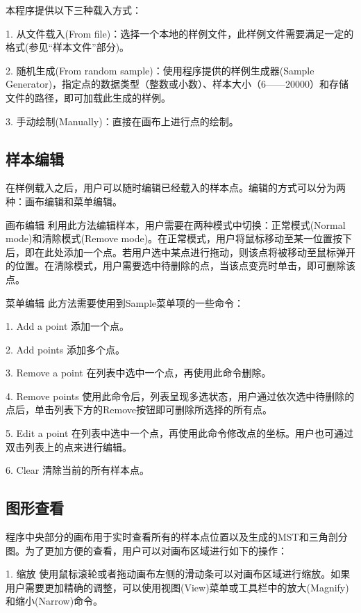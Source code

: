 \documentclass[11pt, a4paper]{article}
\newcommand{\hei}{\CJKfamily{hei}}
\begin{document}
		本程序提供以下三种载入方式：

		1. 从文件载入(From file)：选择一个本地的样例文件，此样例文件需要满足一定的格式(参见“样本文件”部分)。

		2. 随机生成(From random sample)：使用程序提供的样例生成器(Sample Generator)，指定点的数据类型（整数或小数）、样本大小（6——20000）和存储文件的路径，即可加载此生成的样例。

		3. 手动绘制(Manually)：直接在画布上进行点的绘制。

		\subsection{样本编辑}

		在样例载入之后，用户可以随时编辑已经载入的样本点。编辑的方式可以分为两种：画布编辑和菜单编辑。

		{\hei 画布编辑} \quad 利用此方法编辑样本，用户需要在两种模式中切换：正常模式(Normal mode)和清除模式(Remove mode)。在正常模式，用户将鼠标移动至某一位置按下后，即在此处添加一个点。若用户选中某点进行拖动，则该点将被移动至鼠标弹开的位置。在清除模式，用户需要选中待删除的点，当该点变亮时单击，即可删除该点。

		{\hei 菜单编辑} \quad 此方法需要使用到Sample菜单项的一些命令：

		1. Add a point \quad 添加一个点。

		2. Add points  \quad 添加多个点。

		3. Remove a point \quad 在列表中选中一个点，再使用此命令删除。

		4. Remove points  \quad 使用此命令后，列表呈现多选状态，用户通过依次选中待删除的点后，单击列表下方的Remove按钮即可删除所选择的所有点。

		5. Edit a point \quad 在列表中选中一个点，再使用此命令修改点的坐标。用户也可通过双击列表上的点来进行编辑。

		6. Clear  \quad 清除当前的所有样本点。

		\subsection{图形查看}

		程序中央部分的画布用于实时查看所有的样本点位置以及生成的MST和三角剖分图。为了更加方便的查看，用户可以对画布区域进行如下的操作：

		1. 缩放 \quad 使用鼠标滚轮或者拖动画布左侧的滑动条可以对画布区域进行缩放。如果用户需要更加精确的调整，可以使用视图(View)菜单或工具栏中的放大(Magnify)和缩小(Narrow)命令。
\end{document}
